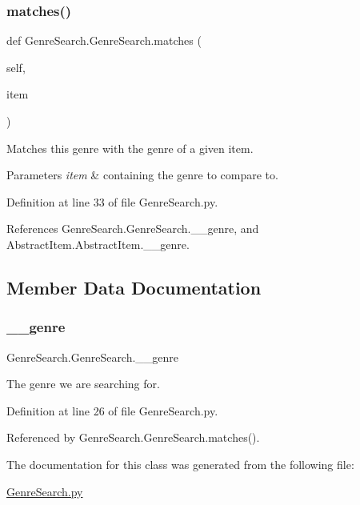\subsubsection{\texorpdfstring{matches()}{matches()}}
{\footnotesize\ttfamily def Genre\+Search.\+Genre\+Search.\+matches (\begin{DoxyParamCaption}\item[{}]{self,  }\item[{}]{item }\end{DoxyParamCaption})}



Matches this genre with the genre of a given item. 


\begin{DoxyParams}{Parameters}
{\em item} & containing the genre to compare to. \\
\hline
\end{DoxyParams}


Definition at line 33 of file Genre\+Search.\+py.



References Genre\+Search.\+Genre\+Search.\+\_\+\+\_\+genre, and Abstract\+Item.\+Abstract\+Item.\+\_\+\+\_\+genre.



\subsection{Member Data Documentation}
\mbox{\label{classGenreSearch_1_1GenreSearch_a659affb5b3425cb942692d18a3d47b36}} 
\subsubsection{\texorpdfstring{\+\_\+\+\_\+genre}{\_\_genre}}
{\footnotesize\ttfamily Genre\+Search.\+Genre\+Search.\+\_\+\+\_\+genre\hspace{0.3cm}{\ttfamily [private]}}



The genre we are searching for. 



Definition at line 26 of file Genre\+Search.\+py.



Referenced by Genre\+Search.\+Genre\+Search.\+matches().



The documentation for this class was generated from the following file\+:\begin{DoxyCompactItemize}
\item 
\hyperlink{GenreSearch_8py}{Genre\+Search.\+py}\end{DoxyCompactItemize}
